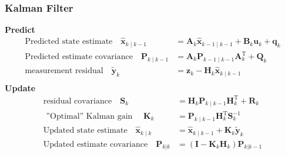 \documentclass[14pt,hyperref={CJKbookmarks=true}]{beamer}
\theoremstyle{plain}
\theoremstyle{definition}
\theoremstyle{remark}
\begin{document}
\begin{frame}
\frametitle{Kalman Filter} 
\small
{\bf{Predict}}
\begin{equation*}
\begin{split}
\text{Predicted state estimate} \quad \hat{\mathbf{x}}_{k\mid k-1} &= \mathbf{A}_k\hat{\mathbf{x}}_{k-1\mid k-1} + \mathbf{B}_k \mathbf{u}_k +\mathbf{q}_{k}\\
\text{Predicted estimate covariance} \quad\mathbf{P}_{k\mid k-1} &=  \mathbf{A}_k \mathbf{P}_{k-1\mid k-1} \mathbf{A}_k^\mathrm{T} + \mathbf{Q}_k\\
\text{measurement residual}\quad \tilde{\mathbf{y}}_k &= \mathbf{z}_k - \mathbf{H}_k\hat{\mathbf{x}}_{k\mid k-1}\\
\end{split}
\end{equation*}
\pause
{\bf{Update}}
\begin{equation*}
\begin{split}
\text{residual covariance}\quad\mathbf{S}_k& = \mathbf{H}_k \mathbf{P}_{k\mid k-1} \mathbf{H}_k^\mathrm{T} + \mathbf{R}_k \\
\text{ ''Optimal'' Kalman gain }\quad \mathbf{K}_k &= \mathbf{P}_{k\mid k-1}\mathbf{H}_k^\mathrm{T} \mathbf{S}_k^{-1}\\
\text{Updated state estimate}\quad \hat{\mathbf{x}}_{k\mid k} &= \hat{\mathbf{x}}_{k\mid k-1} + \mathbf{K}_k\tilde{\mathbf{y}}_k\\
\text{Updated estimate covariance}\quad\mathbf{P}_{k|k} &= (\mathbf{I} - \mathbf{K}_k \mathbf{H}_k) \mathbf{P}_{k|k-1} \\
\end{split}
\end{equation*}
\end{frame}
\end{document}
